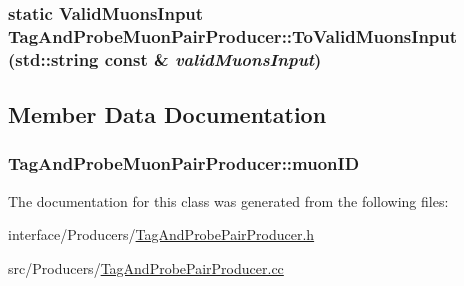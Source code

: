 \label{classTagAndProbeMuonPairProducer_aab5bed4d0e300d632d68ba3a93c3ea64}
\hypertarget{classTagAndProbeMuonPairProducer_a9ef91549235c69471c608919c33483dd}{
\subsubsection[{ToValidMuonsInput}]{\setlength{\rightskip}{0pt plus 5cm}static {\bf ValidMuonsInput} TagAndProbeMuonPairProducer::ToValidMuonsInput (std::string const \& {\em validMuonsInput})}}
\label{classTagAndProbeMuonPairProducer_a9ef91549235c69471c608919c33483dd}


\subsection{Member Data Documentation}
\hypertarget{classTagAndProbeMuonPairProducer_a9a517b5e47d31b7f6c5343d670ec0f3f}{
\subsubsection[{muonID}]{ {\bf TagAndProbeMuonPairProducer::muonID}}}
\label{classTagAndProbeMuonPairProducer_a9a517b5e47d31b7f6c5343d670ec0f3f}


The documentation for this class was generated from the following files:\begin{DoxyCompactItemize}
\item 
interface/Producers/\hyperlink{TagAndProbePairProducer_8h}{TagAndProbePairProducer.h}\item 
src/Producers/\hyperlink{TagAndProbePairProducer_8cc}{TagAndProbePairProducer.cc}\end{DoxyCompactItemize}
